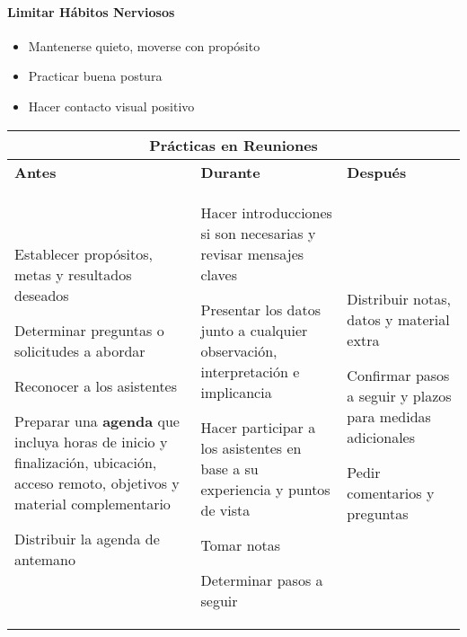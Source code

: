 \paragraph{Limitar Hábitos Nerviosos}
\begin{itemize}
    \item {Mantenerse quieto, moverse con propósito}
    \item {Practicar buena postura}
    \item {Hacer contacto visual positivo}
\end{itemize}

\begin{table}
    \centering
    \begin{tabular}{|p{4.8cm}|p{4.8cm}|p{4.7cm}}
        \hline
        \multicolumn{3}{|c|}{Prácticas en Reuniones} \\
        \hline
        \textbf{Antes} & \textbf{Durante}  &\textbf{Después} \\
        \hline
        \begin{description}
            \item {Establecer propósitos, metas y resultados deseados}
            \item {Determinar preguntas o solicitudes a abordar}
            \item {Reconocer a los asistentes}
            \item {Preparar una \textbf{agenda} que incluya horas de inicio y finalización, ubicación, acceso remoto, objetivos y material complementario}
            \item {Distribuir la agenda de antemano}
        \end{description} & \begin{description}
            \item {Hacer introducciones si son necesarias y revisar mensajes claves}
            \item {Presentar los datos junto a cualquier observación, interpretación e implicancia}
            \item {Hacer participar a los asistentes en base a su experiencia y puntos de vista}
            \item {Tomar notas}
            \item {Determinar pasos a seguir}
        \end{description} &  \begin{description}
            \item {Distribuir notas, datos y material extra}
            \item {Confirmar pasos a seguir y plazos para medidas adicionales}
            \item {Pedir comentarios y preguntas}
        \end{description} \\
        \hline
    \end{tabular}
\end{table}

